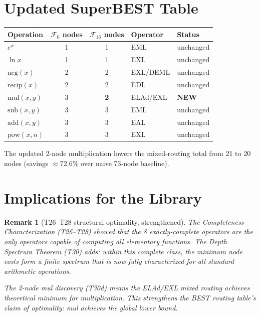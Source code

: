 \documentclass[11pt]{article}
\newtheorem{remark}{Remark}
\begin{document}
\section{Updated SuperBEST Table}

\begin{center}
\begin{tabular}{lccll}
\hline
Operation & $\mathcal{F}_6$ nodes & $\mathcal{F}_{16}$ nodes & Operator & Status \\
\hline
$e^x$        & 1 & 1 & EML        & unchanged \\
$\ln x$      & 1 & 1 & EXL        & unchanged \\
$\mathrm{neg}(x)$ & 2 & 2 & EXL/DEML & unchanged \\
$\mathrm{recip}(x)$ & 2 & 2 & EDL  & unchanged \\
$\mathrm{mul}(x,y)$ & 3 & \textbf{2} & ELAd/EXL & \textbf{NEW} \\
$\mathrm{sub}(x,y)$ & 3 & 3 & EML  & unchanged \\
$\mathrm{add}(x,y)$ & 3 & 3 & EAL  & unchanged \\
$\mathrm{pow}(x,n)$ & 3 & 3 & EXL  & unchanged \\
\hline
\end{tabular}
\end{center}

The updated 2-node multiplication lowers the mixed-routing total from
21 to 20 nodes (savings $\approx 72.6\%$ over naive 73-node baseline).

\section{Implications for the Library}

\begin{remark}[T26--T28 structural optimality, strengthened]
The Completeness Characterization (T26--T28) showed that the 8 exactly-complete
operators are the only operators capable of computing all elementary functions.
The Depth Spectrum Theorem (T30) adds: within this complete class, the
\emph{minimum node costs} form a finite spectrum that is now fully characterized
for all standard arithmetic operations.

The 2-node mul discovery (T30d) means the ELAd/EXL mixed routing achieves
theoretical minimum for multiplication.  This strengthens the BEST routing
table's claim of optimality: mul achieves the global lower bound.
\end{remark}
\end{document}
